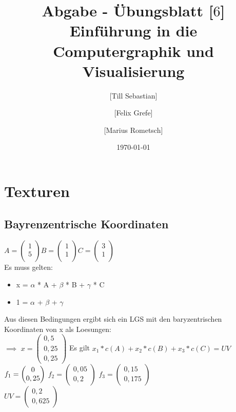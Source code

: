 \documentclass[10pt,a4paper]{article}
\begin{document}
\title{Abgabe - Übungsblatt [$6$]\\
\small{Einführung in die Computergraphik und Visualisierung}}
\author{ [Till Sebastian] \and [Felix Grefe] \and [Marius Rometsch]}
\date{\today}
\maketitle



\section{Texturen}
\subsection{Bayrenzentrische Koordinaten}

$
A =\begin{pmatrix}
1 \\
5 \\

\end{pmatrix}
$$
B =\begin{pmatrix}
1 \\
1 \\

\end{pmatrix}
$$
C =\begin{pmatrix}
	3 \\
	1\\
	 
\end{pmatrix}
$\\
Es muss gelten:

\begin{itemize}
 \item  x = $\alpha$ * A + $\beta$ * B + $\gamma$ * C
 \item  1 = $\alpha$ + $\beta$ + $\gamma$
\end{itemize}
Aus diesen Bedingungen ergibt sich ein LGS mit den baryzentrischen Koordinaten von x als Loesungen:
\\
$\implies$
$
x =\begin{pmatrix}
0,5 \\
0,25 \\
0,25 
\end{pmatrix}
$
Es gilt $x_1*c(A)+x_2*c(B)+x_3*c(C) = UV$$
\\f_1 =\begin{pmatrix}
0 \\
0,25 
\end{pmatrix}
$ $
f_2 =\begin{pmatrix}
0,05 \\
0,2 
\end{pmatrix}
$ 
$
f_3 =\begin{pmatrix}
0,15  \\
0,175
\end{pmatrix}
$
\\
$
UV =\begin{pmatrix}
0,2 \\
0,625
\end{pmatrix}
$ 
\end{document}
